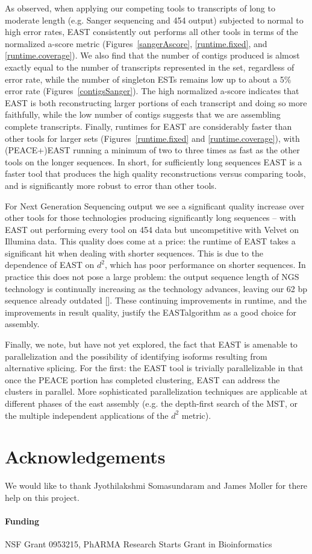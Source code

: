 \documentclass{bioinfo}
\newcommand{\peace} {{\small PEACE}}
\newcommand{\east} {{\small EAST}}
\newcommand{\velvet}{{\small Velvet}}
\begin{document}
As observed, when applying our competing tools to transcripts of long
to moderate length (e.g. Sanger sequencing and 454 output) subjected
to normal to high error rates, \east\/ consistently out performs all
other tools in terms of the normalized a-score metric
(Figures~\ref{sangerAscore}, \ref{runtime.fixed}, and
\ref{runtime.coverage}).  We also find that the number of contigs
produced is almost exactly equal to the number of transcripts
represented in the set, regardless of error rate, while the number of
singleton ESTs remains low up to about a 5\% error rate
(Figures~\ref{contigsSanger}).  The high normalized a-score indicates
that \east\/ is both reconstructing larger portions of each transcript
and doing so more faithfully, while the low number of contigs suggests
that we are assembling complete transcripts.  Finally, runtimes for
\east\/ are considerably faster than other tools for larger sets
(Figures~\ref{runtime.fixed} and \ref{runtime.coverage}), with
(\peace+)\east\/ running a minimum of two to three times as fast as
the other tools on the longer sequences.  In short, for sufficiently
long sequences \east\/ is a faster tool that produces the high quality
reconstructions versus comparing tools, and is significantly more
robust to error than other tools.


For Next Generation Sequencing output we see a significant quality
increase over other tools for those technologies producing
significantly long sequences -- with \east\/ out performing every tool
on 454 data but uncompetitive with \velvet\/ on Illumina data.  This
quality does come at a price: the runtime of \east\/ takes a
significant hit when dealing with shorter sequences.  This is due to
the dependence of \east\/ on $d^2$, which has poor
performance on shorter sequences.  In practice this does not pose a
large problem: the output sequence length of NGS technology is
continually increasing as the technology advances, leaving our 62 bp
sequence already outdated [\cite{Eid09,Li10}].  These continuing
improvements in runtime, and the improvements in result quality,
justify the \east algorithm as a good choice for assembly.


Finally, we note, but have not yet explored, the fact that \east\/ is
amenable to parallelization and the possibility of identifying
isoforms resulting from alternative splicing.  For the first: the
\east\/ tool is trivially parallelizable in that once the \peace\/
portion has completed clustering, \east\/ can address the clusters in
parallel.  More sophisticated parallelization techniques are applicable
at different phases of the east assembly (e.g. the depth-first search
of the MST, or the multiple independent applications of the $d^2$ metric).  


\section*{Acknowledgements} We would like to thank Jyothilakshmi
Somasundaram and James Moller for there help on this project.

\paragraph{Funding\textcolon} NSF Grant 0953215, PhARMA Research
Starts Grant in Bioinformatics


\end{document}

